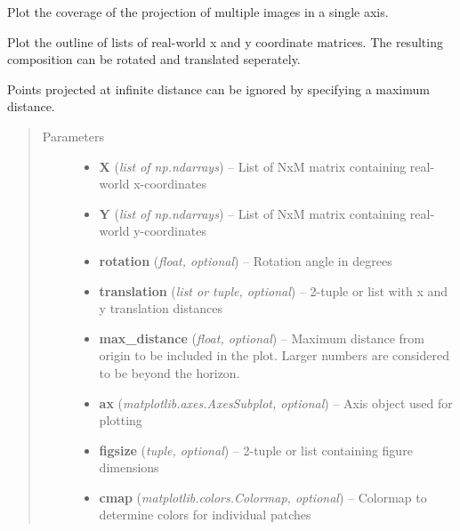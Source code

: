\documentclass[letterpaper,10pt,english]{sphinxmanual}
\begin{document}
\begin{fulllineitems}
\label{rectification:flamingo.rectification.plot.plot_coverage}
Plot the coverage of the projection of multiple images in a single axis.

Plot the outline of lists of real-world x and y coordinate
matrices. The resulting composition can be rotated and
translated seperately.

Points projected at infinite distance can be ignored by
specifying a maximum distance.
\begin{quote}\begin{description}
\item[{Parameters}] \leavevmode\begin{itemize}
\item {} 
\textbf{X} (\emph{list of np.ndarrays}) -- List of NxM matrix containing real-world x-coordinates

\item {} 
\textbf{Y} (\emph{list of np.ndarrays}) -- List of NxM matrix containing real-world y-coordinates

\item {} 
\textbf{rotation} (\emph{float, optional}) -- Rotation angle in degrees

\item {} 
\textbf{translation} (\emph{list or tuple, optional}) -- 2-tuple or list with x and y translation distances

\item {} 
\textbf{max\_distance} (\emph{float, optional}) -- Maximum distance from origin to be included in the plot.
Larger numbers are considered to be beyond the horizon.

\item {} 
\textbf{ax} (\emph{matplotlib.axes.AxesSubplot, optional}) -- Axis object used for plotting

\item {} 
\textbf{figsize} (\emph{tuple, optional}) -- 2-tuple or list containing figure dimensions

\item {} 
\textbf{cmap} (\emph{matplotlib.colors.Colormap, optional}) -- Colormap to determine colors for individual patches


\end{itemize}
\end{description}
\end{quote}
\end{fulllineitems}
\end{document}
